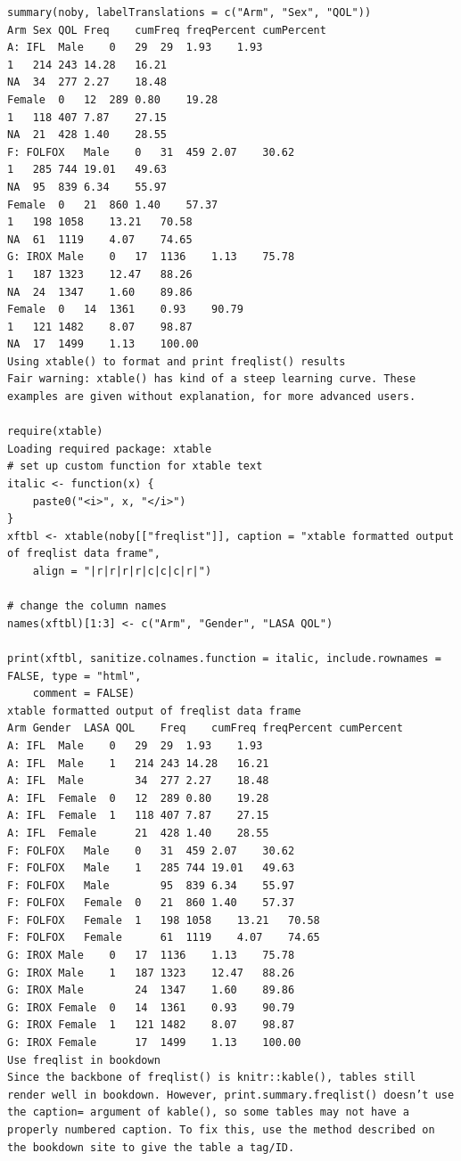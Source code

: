 \documentclass[
]{book}
\begin{document}
\begin{verbatim}
summary(noby, labelTranslations = c("Arm", "Sex", "QOL"))
Arm Sex QOL Freq    cumFreq freqPercent cumPercent
A: IFL  Male    0   29  29  1.93    1.93
1   214 243 14.28   16.21
NA  34  277 2.27    18.48
Female  0   12  289 0.80    19.28
1   118 407 7.87    27.15
NA  21  428 1.40    28.55
F: FOLFOX   Male    0   31  459 2.07    30.62
1   285 744 19.01   49.63
NA  95  839 6.34    55.97
Female  0   21  860 1.40    57.37
1   198 1058    13.21   70.58
NA  61  1119    4.07    74.65
G: IROX Male    0   17  1136    1.13    75.78
1   187 1323    12.47   88.26
NA  24  1347    1.60    89.86
Female  0   14  1361    0.93    90.79
1   121 1482    8.07    98.87
NA  17  1499    1.13    100.00
Using xtable() to format and print freqlist() results
Fair warning: xtable() has kind of a steep learning curve. These examples are given without explanation, for more advanced users.

require(xtable)
Loading required package: xtable
# set up custom function for xtable text
italic <- function(x) {
    paste0("<i>", x, "</i>")
}
xftbl <- xtable(noby[["freqlist"]], caption = "xtable formatted output of freqlist data frame", 
    align = "|r|r|r|r|c|c|c|r|")

# change the column names
names(xftbl)[1:3] <- c("Arm", "Gender", "LASA QOL")

print(xftbl, sanitize.colnames.function = italic, include.rownames = FALSE, type = "html", 
    comment = FALSE)
xtable formatted output of freqlist data frame
Arm Gender  LASA QOL    Freq    cumFreq freqPercent cumPercent
A: IFL  Male    0   29  29  1.93    1.93
A: IFL  Male    1   214 243 14.28   16.21
A: IFL  Male        34  277 2.27    18.48
A: IFL  Female  0   12  289 0.80    19.28
A: IFL  Female  1   118 407 7.87    27.15
A: IFL  Female      21  428 1.40    28.55
F: FOLFOX   Male    0   31  459 2.07    30.62
F: FOLFOX   Male    1   285 744 19.01   49.63
F: FOLFOX   Male        95  839 6.34    55.97
F: FOLFOX   Female  0   21  860 1.40    57.37
F: FOLFOX   Female  1   198 1058    13.21   70.58
F: FOLFOX   Female      61  1119    4.07    74.65
G: IROX Male    0   17  1136    1.13    75.78
G: IROX Male    1   187 1323    12.47   88.26
G: IROX Male        24  1347    1.60    89.86
G: IROX Female  0   14  1361    0.93    90.79
G: IROX Female  1   121 1482    8.07    98.87
G: IROX Female      17  1499    1.13    100.00
Use freqlist in bookdown
Since the backbone of freqlist() is knitr::kable(), tables still render well in bookdown. However, print.summary.freqlist() doesn’t use the caption= argument of kable(), so some tables may not have a properly numbered caption. To fix this, use the method described on the bookdown site to give the table a tag/ID.


\end{verbatim}
\end{document}
